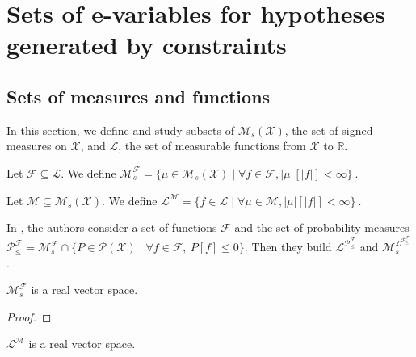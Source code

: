 \chapter{Sets of e-variables for hypotheses generated by constraints}


\section{Sets of measures and functions}

In this section, we define and study subsets of $\mathcal{M}_s(\mathcal{X})$, the set of signed measures on $\mathcal{X}$, and $\mathcal{L}$, the set of measurable functions from $\mathcal{X}$ to $\mathbb{R}$.

\begin{definition}\label{def:integrableMeasures}
Let $\mathcal{F} \subseteq \mathcal{L}$.
We define
$
\mathcal{M}_s^{\mathcal{F}}
  = \{\mu \in \mathcal{M}_s(\mathcal{X}) \mid \forall f \in \mathcal{F}, \vert\mu\vert[\vert f \vert] < \infty\}
  \: .
$
\end{definition}


\begin{definition}\label{def:integrableFunctions}
Let $\mathcal{M} \subseteq \mathcal{M}_s(\mathcal{X})$.
We define
$
\mathcal{L}^{\mathcal{M}}
  = \{f \in \mathcal{L} \mid \forall \mu \in \mathcal{M}, \vert \mu \vert[\vert f \vert] < \infty\}
  \: .
$
\end{definition}

In \cite{larsson2025variables}, the authors consider a set of functions $\mathcal{F}$ and the set of probability measures $\mathcal{P}^{\mathcal{F}}_{\le} = \mathcal{M}_s^{\mathcal{F}} \cap \{P \in \mathcal{P}(\mathcal{X}) \mid \forall f \in \mathcal{F}, \: P[f] \le 0\}$.
Then they build $\mathcal{L}^{\mathcal{P}^{\mathcal{F}}_{\le}}$ and $\mathcal{M}_s^{\mathcal{L}^{\mathcal{P}^{\mathcal{F}}_{\le}}}$.


\begin{lemma}\label{lem:vectorSpace_integrableMeasures}
$\mathcal{M}_s^{\mathcal{F}}$ is a real vector space.
\end{lemma}

\begin{proof}

\end{proof}


\begin{lemma}\label{lem:vectorSpace_integrableFunctions}
$\mathcal{L}^{\mathcal{M}}$ is a real vector space.
\end{lemma}

